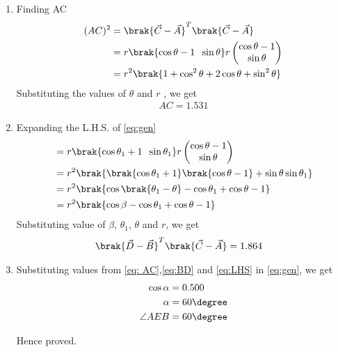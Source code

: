 \begin{enumerate}[label=\thesection.\arabic*.,ref=\thesection.\theenumi]
\item Finding AC 
\begin{align}
(AC)^2 &= \brak{\vec{C}-\vec{A}}^T\brak{\vec{C}-\vec{A}} \\
&= r\brak{\cos\theta-1\hspace{0.2cm} \sin\theta} r\begin{pmatrix}\cos\theta-1\\\sin\theta\end{pmatrix} \\
&= r^2 \brak{1+ \cos^2\theta + 2\cos\theta + \sin^2\theta}
\end{align}
Substituting the values of $\theta$ and $r$ , we get
\begin{align}
AC = 1.531
\label{eq: AC}
\end{align}

\item Expanding the L.H.S. of \eqref{eq:gen}
\begin{align}
&= r\brak{\cos\theta_1+1\hspace{0.2cm}\sin\theta_1} r\begin{pmatrix}
\cos\theta-1\\\sin\theta
\end{pmatrix} \\
&= r^2\brak{\brak{\cos\theta_1+1}\brak{\cos\theta-1}+\sin\theta\sin\theta_1} \\
&= r^2\brak{\cos\brak{\theta_1 - \theta}-\cos\theta_1+\cos\theta -1} \\
&= r^2\brak{\cos\beta-\cos\theta_1+\cos\theta -1}
\end{align}
Substituting value of $\beta$, $\theta_1$, $\theta$ and $r$, we get
\begin{align}
\brak{\vec{D}-\vec{B}}^T\brak{\vec{C} - \vec{A}} &= 1.864
\label{eq:LHS}
\end{align}
\item Substituting values from \eqref{eq: AC},\eqref{eq:BD} and \eqref{eq:LHS} in \eqref{eq:gen}, we get
\begin{align}
\cos\alpha &= 0.500 \\
\alpha &= 60\degree \\
\angle AEB &= 60\degree
\end{align}

Hence proved.
\end{enumerate}